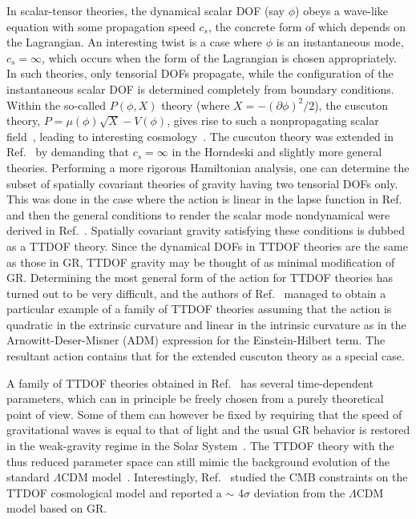 \documentclass[aps,prd,preprintnumbers,superscriptaddress,nofootinbib,notitlepage]{revtex4-2}
\begin{document}
In scalar-tensor theories, the dynamical scalar DOF (say $\phi$) obeys a wave-like equation with some propagation speed $c_s$, the concrete form of which depends on the Lagrangian.
An interesting twist is a case where $\phi$ is an instantaneous mode, $c_s=\infty$, which occurs when the form of the Lagrangian is chosen appropriately.
In such theories, only tensorial DOFs propagate, while the configuration of the instantaneous scalar DOF is determined completely from boundary conditions.
Within the so-called $P(\phi,X)$ theory (where $X=-(\partial\phi)^2/2$), the cuscuton theory, $P=\mu(\phi)\sqrt{X}-V(\phi)$, gives rise to such a nonpropagating scalar field~\cite{Afshordi:2006ad}, leading to interesting cosmology~\cite{Afshordi:2007yx}.
The cuscuton theory was extended in Ref.~\cite{Iyonaga:2018vnu} by demanding that $c_s=\infty$ in the Horndeski and slightly more general theories.
Performing a more rigorous Hamiltonian analysis, one can determine the subset of spatially covariant theories of gravity having two tensorial DOFs only.
This was done in the case where the action is linear in the lapse function in Ref.~\cite{Lin:2017oow} and then the general conditions to render the scalar mode nondynamical were derived in Ref.~\cite{Gao:2019twq}.
Spatially covariant gravity satisfying these conditions
is dubbed as a TTDOF theory.
Since the dynamical DOFs in TTDOF theories are the same as those in GR,
TTDOF gravity may be thought of as minimal modification of GR.
Determining the most general form of the action for TTDOF theories has turned out to be very difficult, and the authors of Ref.~\cite{Gao:2019twq} managed to obtain a particular example of a family of TTDOF theories assuming that the action is quadratic in the extrinsic curvature and linear in the intrinsic curvature as in the Arnowitt-Deser-Misner (ADM) expression for the Einstein-Hilbert term.
The resultant action contains that for the extended cuscuton theory as a special case.


A family of TTDOF theories obtained in Ref.~\cite{Gao:2019twq} has several time-dependent parameters, which can in principle be freely chosen from a purely theoretical point of view.
Some of them can however be fixed by requiring that the speed of gravitational waves is equal to that of light and
the usual GR behavior is restored in the weak-gravity regime in the Solar System~\cite{Iyonaga:2021yfv}.
The TTDOF theory with the thus reduced parameter space
can still mimic the background evolution of the standard $\Lambda$CDM model~\cite{Hiramatsu:2022ahs}.
Interestingly, Ref.~\cite{Hiramatsu:2022ahs} studied the CMB constraints on the TTDOF cosmological model and reported a $\sim$ 4$\sigma$ deviation from the $\Lambda$CDM model based on GR.
\end{document}
